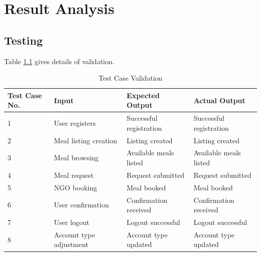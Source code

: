 \selectfont
\chapter{Result Analysis}
\section{Testing}
Table \ref{test1} gives details of validation.


\begin{table}[h!]
  \begin{center}
    \caption{Test Case Validation}
    \label{test1}
    \begin{tabular}{|p{1cm}|p{4cm}|p{4cm}|p{4cm}|}
    \hline
      \textbf{Test Case No.} & \textbf{Input} & \textbf{Expected 
Output} & \textbf{Actual Output}\\

\hline
     1 & User registers & Successful registration & Successful registration \\
\hline
2 & Meal listing creation & Listing created & Listing created \\
\hline
3 & Meal browsing & Available meals listed & Available meals listed \\
\hline
4 & Meal request & Request submitted & Request submitted \\
\hline
5 & NGO booking & Meal booked & Meal booked \\
\hline
6 & User confirmation & Confirmation received & Confirmation received \\
\hline
7 & User logout & Logout successful & Logout successful \\
\hline
8 & Account type adjustment & Account type updated & Account type updated \\
\hline
     \end{tabular}
  \end{center}
\end{table}
